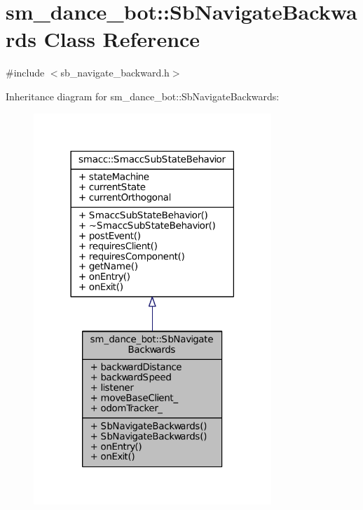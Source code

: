 \hypertarget{classsm__dance__bot_1_1SbNavigateBackwards}{}\section{sm\+\_\+dance\+\_\+bot\+:\+:Sb\+Navigate\+Backwards Class Reference}
\label{classsm__dance__bot_1_1SbNavigateBackwards}


{\ttfamily \#include $<$sb\+\_\+navigate\+\_\+backward.\+h$>$}



Inheritance diagram for sm\+\_\+dance\+\_\+bot\+:\+:Sb\+Navigate\+Backwards\+:
\nopagebreak
\begin{figure}[H]
\begin{center}
\leavevmode
\includegraphics[width=254pt]{classsm__dance__bot_1_1SbNavigateBackwards__inherit__graph}
\end{center}
\end{figure}


